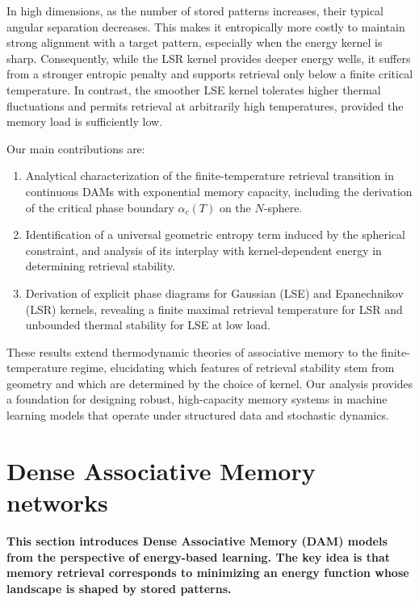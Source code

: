 \documentclass{article}
\theoremstyle{plain}
\theoremstyle{definition}
\theoremstyle{remark}
\begin{document}
In high dimensions, as the number of stored patterns increases, their typical angular separation decreases. This makes it entropically more costly to maintain strong alignment with a target pattern, especially when the energy kernel is sharp. Consequently, while the LSR kernel provides deeper energy wells, it suffers from a stronger entropic penalty and supports retrieval only below a finite critical temperature. In contrast, the smoother LSE kernel tolerates higher thermal fluctuations and permits retrieval at arbitrarily high temperatures, provided the memory load is sufficiently low.

Our main contributions are:
\begin{enumerate}
\item Analytical characterization of the finite-temperature retrieval transition in continuous DAMs with exponential memory capacity, including the derivation of the critical phase boundary $\alpha_c(T)$ on the $N$-sphere.
\item Identification of a universal geometric entropy term induced by the spherical constraint, and analysis of its interplay with kernel-dependent energy in determining retrieval stability.
\item Derivation of explicit phase diagrams for Gaussian (LSE) and Epanechnikov (LSR) kernels, revealing a finite maximal retrieval temperature for LSR and unbounded thermal stability for LSE at low load.
\end{enumerate}

These results extend thermodynamic theories of associative memory to the finite-temperature regime, elucidating which features of retrieval stability stem from geometry and which are determined by the choice of kernel. Our analysis provides a foundation for designing robust, high-capacity memory systems in machine learning models that operate under structured data and stochastic dynamics.








\section{Dense Associative Memory networks}

\textbf{This section introduces Dense Associative Memory (DAM) models from the perspective of energy-based learning. The key idea is that memory retrieval corresponds to minimizing an energy function whose landscape is shaped by stored patterns.}
\end{document}
